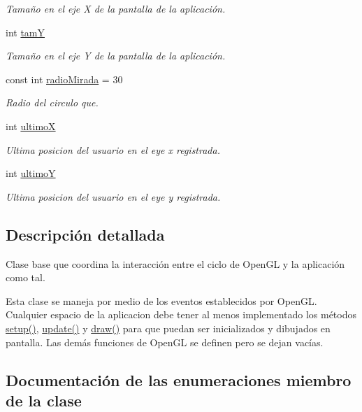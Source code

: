 \begin{DoxyCompactItemize}
\begin{DoxyCompactList}\small\item\em Tamaño en el eje X de la pantalla de la aplicación. \end{DoxyCompactList}\item 
int \hyperlink{classof_app_ac1e9d00b0014a47490688c3b298a67c9}{tam\+Y}
\begin{DoxyCompactList}\small\item\em Tamaño en el eje Y de la pantalla de la aplicación. \end{DoxyCompactList}\item 
const int \hyperlink{classof_app_a92c5745a3f00e98470f2d6d7287da213}{radio\+Mirada} = 30
\begin{DoxyCompactList}\small\item\em Radio del circulo que. \end{DoxyCompactList}\item 
int \hyperlink{classof_app_a6dc30422836aa52bb36cd601c5250ba5}{ultimo\+X}
\begin{DoxyCompactList}\small\item\em Ultima posicion del usuario en el eye x registrada. \end{DoxyCompactList}\item 
int \hyperlink{classof_app_a0d785c36d4483946c4e43b7a1cecffe9}{ultimo\+Y}
\begin{DoxyCompactList}\small\item\em Ultima posicion del usuario en el eye y registrada. \end{DoxyCompactList}\end{DoxyCompactItemize}


\subsection{Descripción detallada}
Clase base que coordina la interacción entre el ciclo de Open\+G\+L y la aplicación como tal. 

Esta clase se maneja por medio de los eventos establecidos por Open\+G\+L. Cualquier espacio de la aplicacion debe tener al menos implementado los métodos \hyperlink{classof_app_af68eaa1366244f7a541cd08e02199c12}{setup()}, \hyperlink{classof_app_afef41ea4aee5a22ea530afba33ae7a7b}{update()} y \hyperlink{classof_app_a75dd45437b9e317db73d8daef1ad49f8}{draw()} para que puedan ser inicializados y dibujados en pantalla. Las demás funciones de Open\+G\+L se definen pero se dejan vacías. 

\subsection{Documentación de las enumeraciones miembro de la clase}
\hypertarget{classof_app_aab1f96029bf7fd45f397fc24647f3494}{}
